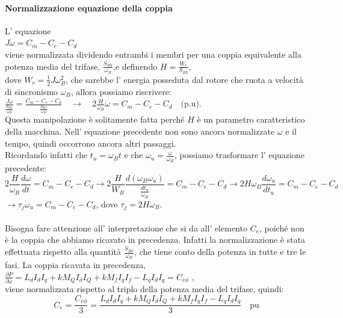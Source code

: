 \documentclass[Lau,noexaminfo]{sapthesis}
\begin{document}
	 \paragraph{Normalizzazione equazione della coppia}
	 L' equazione\\
	 $J\dot{\omega}=C_m-C_e-C_d$ \\viene normalizzata dividendo entrambi i membri per una coppia equivalente alla potenza media del trifase, $\frac{S_{B3}}{\omega_B}$,e definendo
	 $H=\frac{W_r}{S_{B3}}$,\\dove $W_r=\frac{1}{2}J\omega_B^2$, che sarebbe l' energia posseduta dal rotore che ruota a velocità di sincronismo $\omega_B$, allora possiamo riscrivere:\\
	 $\frac{J\dot{\omega}}{\frac{S_{B3}}{\omega_B}}=\frac{C_m-C_e -C_d}{\frac{S_{B3}}{\omega_B}}\quad\rightarrow\quad2\frac{H}{\omega_B}\dot{\omega}=C_m -C_e -C_d\quad \text{(p.u)}$. \\Questa manipolazione è solitamente fatta perché $H$ è un parametro caratteristico della macchina. Nell' equazione precedente non sono ancora normalizzate $\omega$ e il tempo, quindi occorrono ancora altri passaggi.\\Ricordando infatti che $t_u=\omega_Bt$ e che $\omega_u=\frac{\omega}{\omega_B}$, possiamo trasformare l' equazione precedente:\\
	 \begin{equation*}
	 2\frac{H}{\omega_B} \frac{d\omega}{dt}=C_m-C_e-C_d \rightarrow 2\frac{H}{W_B}\frac{d(\omega_B \omega_u)}{\frac{dt_u}{\omega_B}}=C_m-C_e-C_d \rightarrow 2H\omega_B \frac{d\omega_u}{dt_u}=C_m-C_e-C_d 
	 \end{equation*}
	 $\rightarrow \tau_j \dot{\omega}_u=C_m-C_e-C_d$, dove $\tau_j=2H\omega_B$.\\\\
	 Bisogna fare attenzione all' interpretazione che si da all' elemento $C_e$, poiché non è la coppia che abbiamo ricavato in precedenza. Infatti la normalizzazione è stata effettuata rispetto alla quantità $\frac{S_{B3}}{\omega_B}$, che tiene conto della potenza in tutte e tre le fasi. La coppia ricavata in precedenza,\\
	 $\frac{\partial P}{\partial \omega} = L_dI_dI_q+kM_QI_dI_Q+kM_fI_qI_f-L_qI_dI_q=C_{e\phi} $ ,\\
	 viene normalizzata rispetto al triplo della potenza media del trifase, quindi:\\
	 \begin{equation*}
	 C_e=\frac{C_{e\phi}}{3}=\frac{L_dI_dI_q+kM_QI_dI_Q+kM_fI_qI_f-L_qI_dI_q}{3}\quad\text{pu}
	 \end{equation*}
\end{document}
